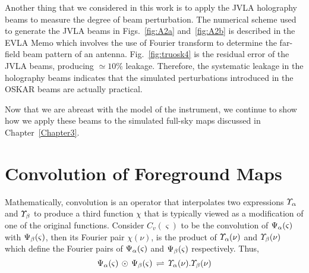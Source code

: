 Another thing that we considered in this work is to apply the JVLA holography beams to measure the degree of beam perturbation. The numerical scheme used to generate 
the JVLA beams in Figs.~\ref{fig:A2a} and~\ref{fig:A2b} is described in the EVLA Memo \citep{2015Rick} which involves the use of Fourier transform to determine the far-field 
beam pattern of an antenna. Fig.~\ref{fig:truosk4} is the residual error of the JVLA beams, producing $\simeq 10 \%$ leakage. Therefore, the systematic leakage in the holography
beams indicates that the simulated perturbations introduced in the OSKAR beams  are actually practical. 

Now that we are abreast with the model of the instrument, we continue to show how we apply these beams to the simulated full-sky maps discussed in Chapter~\ref{Chapter3}.

\section{Convolution of Foreground Maps}    \label{sec:convolution}

Mathematically, convolution is an  operator that interpolates two expressions $\varUpsilon_{\rm \alpha}$ and $\varUpsilon_{\rm \beta}$ 
to produce a third function $\chi$ 
that is typically viewed as a modification of one of the original functions. Consider $C_{v}(\varsigma)$ to be the convolution of $ \Psi_{\rm \alpha}(\varsigma)$
with $ \Psi_{\rm \beta}(\varsigma)$, then its Fourier pair  $\chi(\nu)$, is the product of $\varUpsilon_{\rm \alpha} (\nu)$ and $\varUpsilon_{\rm \beta} (\nu)$ which define the 
Fourier pairs of $ \Psi_{\rm \alpha}(\varsigma)$ and $ \Psi_{\rm \beta}(\varsigma)$ respectively. Thus,
%
\begin{equation}  \Psi_{\rm \alpha}(\varsigma)\, \odot\, \Psi_{\rm \beta}(\varsigma) \, \rightleftharpoons \, \varUpsilon_{\rm \alpha} (\nu). \varUpsilon_{\rm \beta} (\nu) \label{eq:u31} \end{equation}
%

